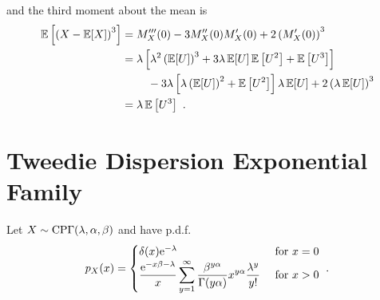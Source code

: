 and the third moment about the mean is
\begin{align}
  \expectation\left[\left(X-\expectation[X]\right)^3\right] & =
  M_X'''(0) - 3M_X''(0)M_X'(0) + 2\left(M_X'(0)\right)^3
  \nonumber\\
  &=
  \begin{multlined}[t]
    \lambda \left[
      \lambda^2 \left(\expectation[U]\right)^3 + 3\lambda \expectation[U]\expectation\left[U^2\right] + \expectation\left[U^3\right]
    \right]
    \\-3\lambda\left[\lambda\left(\expectation[U]\right)^2+\expectation\left[U^2\right]\right]\lambda\expectation[U] + 2\left(\lambda\expectation[U]\right)^3
  \end{multlined}
  \nonumber\\
  &=\lambda\expectation\left[U^3\right] \ .
\end{align}

\section{Tweedie Dispersion Exponential Family}
\label{chapter:appendix_tweedie}
Let $X\sim\operatorname{CP\Gamma}(\lambda,\alpha,\beta)$ and have p.d.f.
\begin{equation}
  p_X(x) = 
  \begin{cases}
    \delta(x) \mathrm{e}^{-\lambda} & \text{ for } x=0 \\ 
    \dfrac{\mathrm{e}^{-x\beta-\lambda}}{x}
    \displaystyle\sum_{y=1}^{\infty}\dfrac{\beta^{y\alpha}}{\Gamma(y\alpha)}x^{y\alpha}\frac{\lambda^y}{y!} & \text{ for } x>0
  \end{cases}
  \ .
  \label{eq:appendix_compoundPoisson_pdf}
\end{equation}

